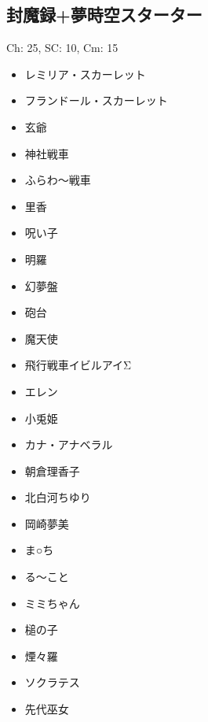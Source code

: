 \documentclass[line_length=22zw,number_of_lines=45,twocolumn]{jlreq}
\begin{document}
\subsection{封魔録+夢時空スターター}
Ch: 25, SC: 10, Cm: 15
\begin{itemize}
	\item レミリア・スカーレット
	\item フランドール・スカーレット
	\item 玄爺
	\item 神社戦車
	\item ふらわ〜戦車
	\item 里香
	\item 呪い子
	\item 明羅
	\item 幻夢盤
	\item 砲台
	\item 魔天使
	\item 飛行戦車イビルアイΣ
	\item エレン
	\item 小兎姫
	\item カナ・アナベラル
	\item 朝倉理香子
	\item 北白河ちゆり
	\item 岡崎夢美
	\item ま○ち
	\item る〜こと
	\item ミミちゃん
	\item 槌の子
	\item 煙々羅
	\item ソクラテス
	\item 先代巫女
\end{itemize}
\pagebreak
\end{document}

